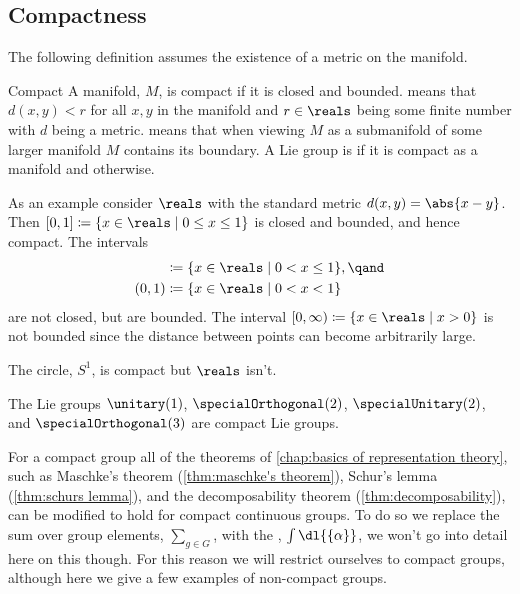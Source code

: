\documentclass[fleqn]{NotesClass}
\begin{document}
    \subsection{Compactness}    
    The following definition assumes the existence of a metric on the manifold.
    \begin{dfn}{Compact}{}
        A manifold, \(M\), is compact if it is closed and bounded.
         means that \(d(x, y) < r\) for all \(x, y\) in the manifold and \(r \in \reals\) being some finite number with \(d\) being a metric.
         means that when viewing \(M\) as a submanifold of some larger manifold \(M\) contains its boundary.
        A Lie group is  if it is compact as a manifold and  otherwise.
    \end{dfn}
    
    As an example consider \(\reals\) with the standard metric \(d(x, y) = \abs{x - y}\).
    Then \([0, 1] \coloneqq \{x \in \reals \mid 0 \le x \le 1\}\) is closed and bounded, and hence compact.
    The intervals
    \begin{align}
        [0, 1) &\coloneqq \{x \in \reals \mid 0 \le x < 1\},\\
        (0, 1] &\coloneqq \{x \in \reals \mid 0 < x \le 1\}, \qand\\
        (0, 1) &\coloneqq \{x \in \reals \mid 0 < x < 1\}
    \end{align}
    are not closed, but are bounded.
    The interval \([0, \infty) \coloneqq \{x \in \reals \mid x > 0\}\) is not bounded since the distance between points can become arbitrarily large.
    
    The circle, \(S^1\), is compact but \(\reals\) isn't.
    
    \begin{exm}{}{}
        The Lie groups \(\unitary(1)\), \(\specialOrthogonal(2)\), \(\specialUnitary(2)\), and \(\specialOrthogonal(3)\) are compact Lie groups.
    \end{exm}
    
    For a compact group all of the theorems of \cref{chap:basics of representation theory}, such as Maschke's theorem (\cref{thm:maschke's theorem}), Schur's lemma (\cref{thm:schurs lemma}), and the decomposability theorem (\cref{thm:decomposability}), can be modified to hold for compact continuous groups.
    To do so we replace the sum over group elements, \(\sum_{g\in G}\), with the , \(\int \dl{\{\alpha\}}\), we won't go into detail here on this though.
    For this reason we will restrict ourselves to compact groups, although here we give a few examples of non-compact groups.
    
\end{document}
